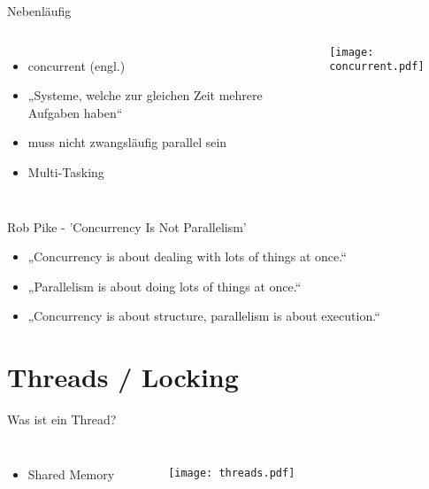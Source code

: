 \documentclass[compress]{beamer}
\begin{document}
  \begin{frame}{Nebenläufig}
    \begin{columns}[c]
      \begin{itemize}
        \item concurrent (engl.)
        \item „Systeme, welche zur gleichen Zeit mehrere Aufgaben haben“
        \item muss nicht zwangsläufig parallel sein
        \item Multi-Tasking
      \end{itemize}
      \texttt{[image: concurrent.pdf]}
    \end{columns}
  \end{frame}
  
  \note[itemize]{
  }

  \begin{frame}{Rob Pike - 'Concurrency Is Not Parallelism'}
    \begin{itemize}
      \item „Concurrency is about dealing with lots of things at once.“
      \item „Parallelism is about doing lots of things at once.“
      \item „Concurrency is about structure, parallelism is about execution.“
    \end{itemize}
  \end{frame}


\section{Threads / Locking}
  \begin{frame}{Was ist ein Thread?}
    \begin{columns}[c]
      \begin{itemize}
        \item Shared Memory
      \end{itemize}
      \begin{figure}
        \centering
        \texttt{[image: threads.pdf]}
      \end{figure}
    \end{columns}
  \end{frame}
  
\end{document}
